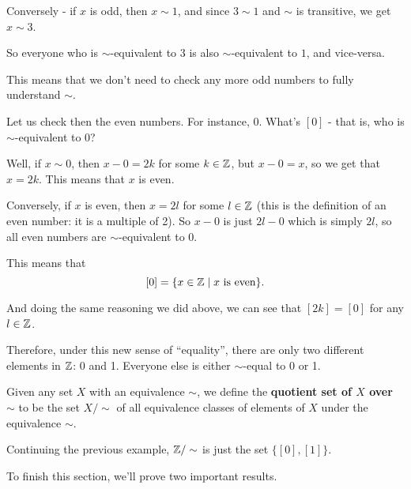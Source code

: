 \begin{ex}
Conversely - if $x$ is odd, then $x\sim 1$, and since $3\sim 1$ and $\sim$ is transitive, we get $x\sim 3$.

So everyone who is $\sim$-equivalent to $3$ is also $\sim$-equivalent to $1$, and vice-versa.

This means that we don't need to check any more odd numbers to fully understand $\sim$.

\bigskip
Let us check then the even numbers. For instance, 0. What's $[0]$ - that is, who is $\sim$-equivalent to $0$?

Well, if $x\sim 0$, then $x-0=2k$ for some $k\in\mathbb{Z}$, but $x-0=x$, so we get that $x=2k$. This means that $x$ is even.

Conversely, if $x$ is even, then $x=2l$ for some $l\in\mathbb{Z}$ (this is the definition of an even number: it is a multiple of 2). So $x-0$ is just $2l-0$ which is simply $2l$, so all even numbers are $\sim$-equivalent to $0$.

This means that
\[[0]=\{x\in\mathbb{Z}\mid x\mbox{ is even}\}.\]

And doing the same reasoning we did above, we can see that $[2k]=[0]$ for any $l\in\mathbb{Z}$.

Therefore, under this new sense of ``equality'', there are only two different elements in $\mathbb{Z}$: 0 and 1. Everyone else is either $\sim$-equal to 0 or 1.
\end{ex}

\begin{df}
	Given any set $X$ with an equivalence $\sim$, we define the \textbf{quotient set of $X$ over $\sim$} to be the set $X/\sim$ of all equivalence classes of elements of $X$ under the equivalence $\sim$.
\end{df}

\begin{ex}
	Continuing the previous example, $\mathbb{Z}/\sim$ is just the set $\{[0],[1]\}$.
\end{ex}

To finish this section, we'll prove two important results.

